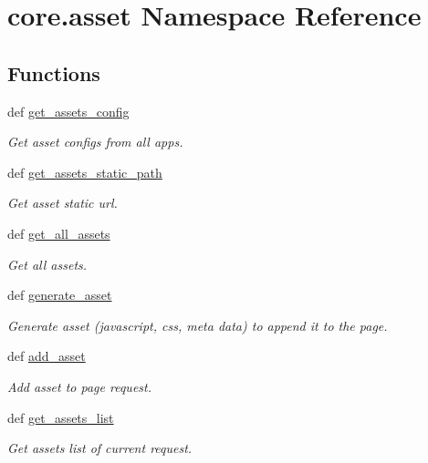 \hypertarget{namespacecore_1_1asset}{\section{core.\-asset Namespace Reference}
\label{namespacecore_1_1asset}
}
\subsection*{Functions}
\begin{DoxyCompactItemize}
\item 
def \hyperlink{namespacecore_1_1asset_abfc7c1a6c6867f4733a6cf6e69af7330}{get\-\_\-assets\-\_\-config}
\begin{DoxyCompactList}\small\item\em Get asset configs from all apps. \end{DoxyCompactList}\item 
def \hyperlink{namespacecore_1_1asset_a5d116997dde8bebaf5a9ab0662f8b620}{get\-\_\-assets\-\_\-static\-\_\-path}
\begin{DoxyCompactList}\small\item\em Get asset static url. \end{DoxyCompactList}\item 
def \hyperlink{namespacecore_1_1asset_ad6694dc10b60b018c7a9fdc106bf83d7}{get\-\_\-all\-\_\-assets}
\begin{DoxyCompactList}\small\item\em Get all assets. \end{DoxyCompactList}\item 
def \hyperlink{namespacecore_1_1asset_a84e2f9bd4a53fdec3f304b964baf797f}{generate\-\_\-asset}
\begin{DoxyCompactList}\small\item\em Generate asset (javascript, css, meta data) to append it to the page. \end{DoxyCompactList}\item 
def \hyperlink{namespacecore_1_1asset_a73ef12f397290d3646061f8df5c837f7}{add\-\_\-asset}
\begin{DoxyCompactList}\small\item\em Add asset to page request. \end{DoxyCompactList}\item 
def \hyperlink{namespacecore_1_1asset_a8e55394c1952c1354e357000632b1589}{get\-\_\-assets\-\_\-list}
\begin{DoxyCompactList}\small\item\em Get assets list of current request. \end{DoxyCompactList}\item 

\end{DoxyCompactItemize}
